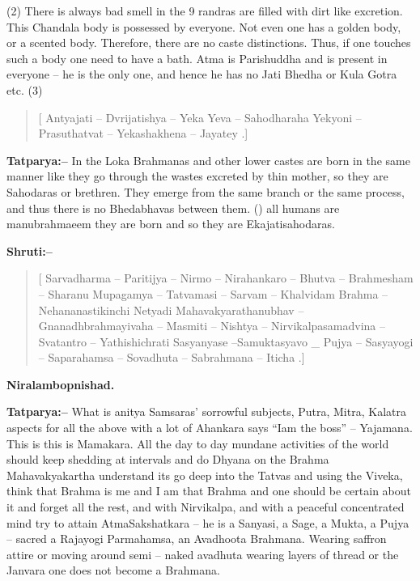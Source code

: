 (2) There is always bad smell in the 9 randras are filled with dirt like excretion. This Chandala body is possessed by everyone. Not even one has a golden body, or a scented body. Therefore, there are no caste distinctions. Thus, if one touches such a body one need to have a bath. Atma is Parishuddha and is present in everyone – he is the only one, and hence he has no Jati Bhedha or Kula Gotra etc. (3)

\begin{verse}
[ Antyajati – Dvrijatishya – Yeka Yeva – Sahodharaha  Yekyoni – Prasuthatvat – Yekashakhena – Jayatey .]
\end{verse}

\textbf{Tatparya:–} In the Loka Brahmanas and other lower castes are born in the same manner like they go through the wastes excreted by thin mother, so they are Sahodaras or brethren. They emerge from the same branch or the same process, and thus there is no Bhedabhavas between them. () all humans are manubrahmaeem they are born and so they are Ekajatisahodaras.

\textbf{Shruti:–}

\begin{verse}
[ Sarvadharma – Paritijya – Nirmo – Nirahankaro – Bhutva – Brahmesham – Sharanu Mupagamya – Tatvamasi – Sarvam – Khalvidam Brahma – Nehananastikinchi Netyadi  Mahavakyarathanubhav – Gnanadhbrahmayivaha – Masmiti – Nishtya – Nirvikalpasamadvina – Svatantro – Yathishichrati  Sasyanyase –Samuktasyavo \_ Pujya – Sasyayogi – Saparahamsa – Sovadhuta – Sabrahmana – Iticha .]
\end{verse}

\begin{flushright}
\textbf{Niralambopnishad.}
\end{flushright}

\textbf{Tatparya:–} What is anitya Samsaras' sorrowful subjects, Putra, Mitra, Kalatra aspects for all the above with a lot of Ahankara says “Iam the boss” – Yajamana. This is this is Mamakara. All the day to day mundane activities of the world should keep shedding at intervals and do Dhyana on the Brahma Mahavakyakartha understand its go deep into the Tatvas and using the Viveka, think that Brahma is me and I am that Brahma and one should be certain about it and forget all the rest, and with Nirvikalpa, and with a peaceful concentrated mind try to attain AtmaSakshatkara – he is a Sanyasi, a Sage, a Mukta, a Pujya – sacred a Rajayogi Parmahamsa, an Avadhoota Brahmana. Wearing saffron attire or moving around semi – naked avadhuta wearing layers of thread or the Janvara one does not become a Brahmana.

